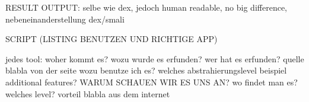 RESULT OUTPUT:
selbe wie dex, jedoch human readable, no big difference, nebeneinanderstellung dex/smali

SCRIPT (LISTING BENUTZEN UND RICHTIGE APP)




jedes tool:\newline
woher kommt es?\newline
wozu wurde es erfunden?\newline
wer hat es erfunden? quelle\newline
blabla von der seite\newline
wozu benutze ich es?\newline
welches abstrahierungslevel\newline
beispiel\newline
additional features?\newline
WARUM SCHAUEN WIR ES UNS AN?\newline
wo findet man es?\newline
welches level?\newline
vorteil\newline
blabla aus dem internet\newline
